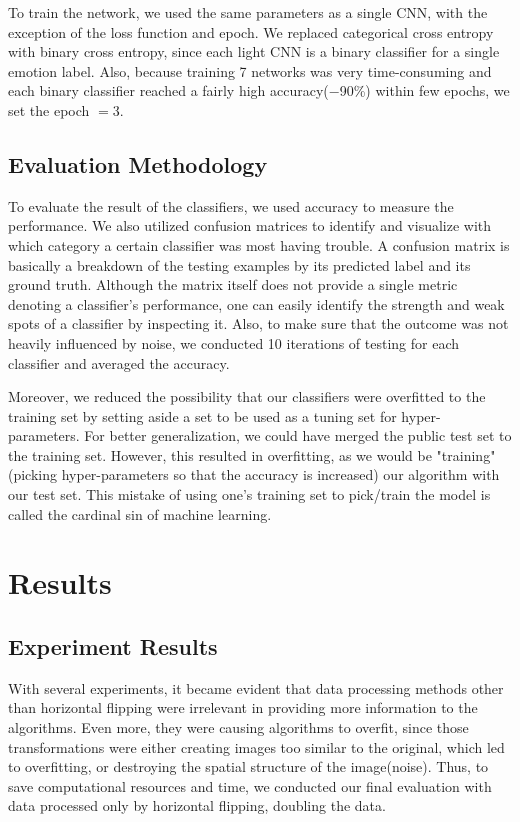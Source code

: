 \documentclass[11pt]{article}
\begin{document}
To train the network, we used the same parameters as a single CNN, with the exception of the loss function and epoch. We replaced categorical cross entropy with binary cross entropy, since each light CNN is a binary classifier for a single emotion label. Also, because training 7 networks was very time-consuming and each binary classifier reached a fairly high accuracy($-$90\%) within few epochs, we set the epoch $=3$.
    
	\subsection{Evaluation Methodology}
	To evaluate the result of the classifiers, we used accuracy to measure the performance. We also utilized confusion matrices to identify and visualize with which category a certain classifier was most having trouble. A confusion matrix is basically a breakdown of the testing examples by its predicted label and its ground truth. Although the matrix itself does not provide a single metric denoting a classifier's performance, one can easily identify the strength and weak spots of a classifier by inspecting it. Also, to make sure that the outcome was not heavily influenced by noise, we conducted 10 iterations of testing for each classifier and averaged the accuracy.
	
	Moreover, we reduced the possibility that our classifiers were overfitted to the training set by setting aside a set to be used as a tuning set for hyper-parameters. For better generalization, we could have merged the public test set to the training set. However, this resulted in overfitting, as we would be "training"(picking hyper-parameters so that the accuracy is increased) our algorithm with our test set. This mistake of using one's training set to pick/train the model is called the cardinal sin of machine learning.
	
	\section{Results}
	
	\subsection{Experiment Results}
	With several experiments, it became evident that data processing methods other than horizontal flipping were irrelevant in providing more information to the algorithms. Even more, they were causing algorithms to overfit, since those transformations were either creating images too similar to the original, which led to overfitting, or destroying the spatial structure of the image(noise). Thus, to save computational resources and time, we conducted our final evaluation with data processed only by horizontal flipping, doubling the data.	
	
\end{document}
